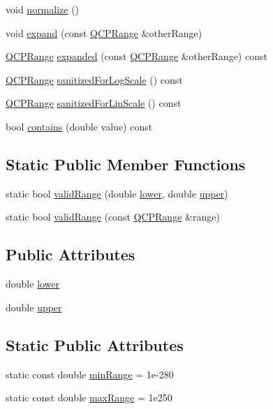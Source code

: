 \begin{DoxyCompactItemize}
\item 
void \hyperlink{classQCPRange_af914a7740269b0604d0827c634a878a9}{normalize} ()
\item 
void \hyperlink{classQCPRange_a0fa1bc8048be50d52bea93a8caf08305}{expand} (const \hyperlink{classQCPRange}{Q\+C\+P\+Range} \&other\+Range)
\item 
\hyperlink{classQCPRange}{Q\+C\+P\+Range} \hyperlink{classQCPRange_a6437bdf29a7ebc2c88a6045c4e622384}{expanded} (const \hyperlink{classQCPRange}{Q\+C\+P\+Range} \&other\+Range) const 
\item 
\hyperlink{classQCPRange}{Q\+C\+P\+Range} \hyperlink{classQCPRange_aaf6a9046e78d91eeb8e89584fe46b034}{sanitized\+For\+Log\+Scale} () const 
\item 
\hyperlink{classQCPRange}{Q\+C\+P\+Range} \hyperlink{classQCPRange_a1ff029704c29a75adbc1dc36cecaf44c}{sanitized\+For\+Lin\+Scale} () const 
\item 
bool \hyperlink{classQCPRange_a030ce95b527c32e01414d0351347b46d}{contains} (double value) const 
\end{DoxyCompactItemize}
\subsection*{Static Public Member Functions}
\begin{DoxyCompactItemize}
\item 
static bool \hyperlink{classQCPRange_ab38bd4841c77c7bb86c9eea0f142dcc0}{valid\+Range} (double \hyperlink{classQCPRange_aa3aca3edb14f7ca0c85d912647b91745}{lower}, double \hyperlink{classQCPRange_ae44eb3aafe1d0e2ed34b499b6d2e074f}{upper})
\item 
static bool \hyperlink{classQCPRange_a801b964752eaad6219be9d8a651ec2b3}{valid\+Range} (const \hyperlink{classQCPRange}{Q\+C\+P\+Range} \&range)
\end{DoxyCompactItemize}
\subsection*{Public Attributes}
\begin{DoxyCompactItemize}
\item 
double \hyperlink{classQCPRange_aa3aca3edb14f7ca0c85d912647b91745}{lower}
\item 
double \hyperlink{classQCPRange_ae44eb3aafe1d0e2ed34b499b6d2e074f}{upper}
\end{DoxyCompactItemize}
\subsection*{Static Public Attributes}
\begin{DoxyCompactItemize}
\item 
static const double \hyperlink{classQCPRange_ab46d3bc95030ee25efda41b89e2b616b}{min\+Range} = 1e-\/280
\item 
static const double \hyperlink{classQCPRange_a5ca51e7a2dc5dc0d49527ab171fe1f4f}{max\+Range} = 1e250
\end{DoxyCompactItemize}

